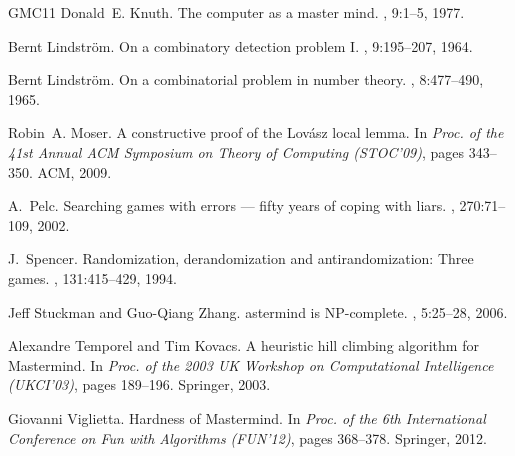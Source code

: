 \documentclass[english,a4paper,11pt]{article}
\begin{document}
\begin{thebibliography}{GMC11}
Donald~E. Knuth.
\newblock The computer as a master mind.
, 9:1--5, 1977.

Bernt Lindstr\"om.
\newblock On a combinatory detection problem {I}.
, 9:195--207, 1964.

Bernt Lindstr\"om.
\newblock On a combinatorial problem in number theory.
, 8:477--490, 1965.

Robin~A. Moser.
\newblock A constructive proof of the {L}ov\'asz local lemma.
\newblock In {\em Proc. of the 41st Annual ACM Symposium on Theory of Computing
  (STOC'09)}, pages 343--350. ACM, 2009.

A.~Pelc.
\newblock Searching games with errors --- fifty years of coping with liars.
, 270:71--109, 2002.

J.~Spencer.
\newblock Randomization, derandomization and antirandomization: Three games.
, 131:415--429, 1994.

Jeff Stuckman and Guo{-Q}iang Zhang.
astermind is {NP}-complete.
, 5:25--28, 2006.

Alexandre Temporel and Tim Kovacs.
\newblock A heuristic hill climbing algorithm for {M}astermind.
\newblock In {\em Proc. of the 2003 UK Workshop on Computational Intelligence
  (UKCI'03)}, pages 189--196. Springer, 2003.

Giovanni Viglietta.
\newblock Hardness of {M}astermind.
\newblock In {\em Proc. of the 6th International Conference on Fun with
  Algorithms (FUN'12)}, pages 368--378. Springer, 2012.

\end{thebibliography}
\end{document}
